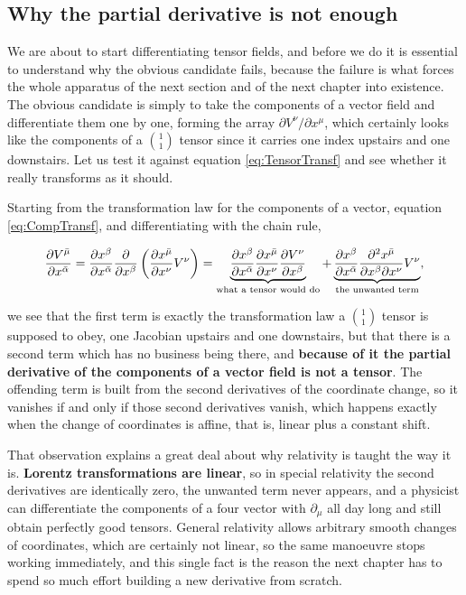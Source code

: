     \subsection{Why the partial derivative is not enough}

        We are about to start differentiating tensor fields, and before we do it is essential to understand why the obvious candidate fails, because the failure is what forces the whole apparatus of the next section and of the next chapter into existence. The obvious candidate is simply to take the components of a vector field and differentiate them one by one, forming the array $\partial V^{\nu}/\partial x^{\mu}$, which certainly looks like the components of a $\binom{1}{1}$ tensor since it carries one index upstairs and one downstairs. Let us test it against equation \ref{eq:TensorTransf} and see whether it really transforms as it should.

        Starting from the transformation law for the components of a vector, equation \ref{eq:CompTransf}, and differentiating with the chain rule,

        \begin{align*}
            \frac{\partial V^{\Bar{\mu}}}{\partial x^{\Bar{\alpha}}} = \frac{\partial x^{\beta}}{\partial x^{\Bar{\alpha}}}\frac{\partial}{\partial x^{\beta}}\left(\frac{\partial x^{\Bar{\mu}}}{\partial x^{\nu}}V^{\nu}\right) = \underbrace{\frac{\partial x^{\beta}}{\partial x^{\Bar{\alpha}}}\frac{\partial x^{\Bar{\mu}}}{\partial x^{\nu}}\frac{\partial V^{\nu}}{\partial x^{\beta}}}_{\text{what a tensor would do}} + \underbrace{\frac{\partial x^{\beta}}{\partial x^{\Bar{\alpha}}}\frac{\partial^2 x^{\Bar{\mu}}}{\partial x^{\beta}\partial x^{\nu}}V^{\nu}}_{\text{the unwanted term}},
        \end{align*}

        we see that the first term is exactly the transformation law a $\binom{1}{1}$ tensor is supposed to obey, one Jacobian upstairs and one downstairs, but that there is a second term which has no business being there, and \textbf{because of it the partial derivative of the components of a vector field is not a tensor}. The offending term is built from the second derivatives of the coordinate change, so it vanishes if and only if those second derivatives vanish, which happens exactly when the change of coordinates is affine, that is, linear plus a constant shift.

        That observation explains a great deal about why relativity is taught the way it is. \textbf{Lorentz transformations are linear}, so in special relativity the second derivatives are identically zero, the unwanted term never appears, and a physicist can differentiate the components of a four vector with $\partial_{\mu}$ all day long and still obtain perfectly good tensors. General relativity allows arbitrary smooth changes of coordinates, which are certainly not linear, so the same manoeuvre stops working immediately, and this single fact is the reason the next chapter has to spend so much effort building a new derivative from scratch.

